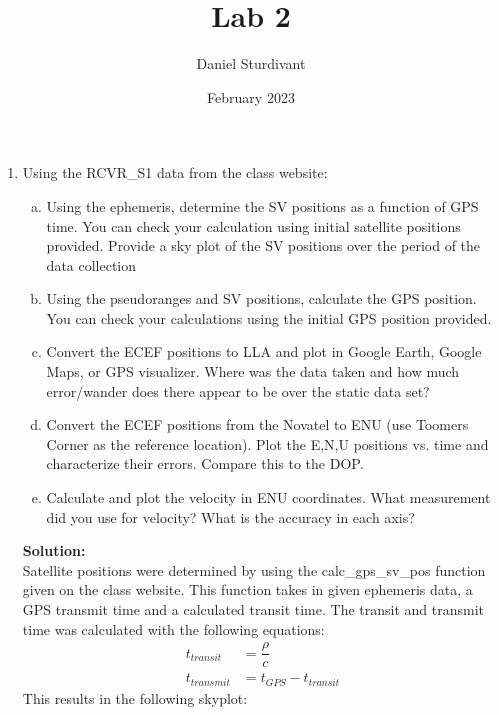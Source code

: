 \documentclass[11pt]{article}
\author{Daniel Sturdivant}
\title{Lab 2}
\date{February 2023}
\newcommand{\solution}{\textbf{Solution: \\}}
\begin{document}
\maketitle
\thispagestyle{fancy}
\setlength{\parindent}{0pt}

\begin{enumerate}[label=\textbf{\arabic*.}]
  \itemsep 24pt
  \item Using the RCVR\_S1 data from the class website: 
  \begin{enumerate}[(a)]
    \itemsep -2pt 
    \item Using the ephemeris, determine the SV positions as a function of GPS time. You can
    check your calculation using initial satellite positions provided. Provide a sky plot of the
    SV positions over the period of the data collection
    \item Using the pseudoranges and SV positions, calculate the GPS position. You can check
    your calculations using the initial GPS position provided.
    \item Convert the ECEF positions to LLA and plot in Google Earth, Google Maps, or GPS
    visualizer. Where was the data taken and how much error/wander does there appear to
    be over the static data set?
    \item Convert the ECEF positions from the Novatel to ENU (use Toomers Corner as the
    reference location). Plot the E,N,U positions vs. time and characterize their errors.
    Compare this to the DOP.
    \item Calculate and plot the velocity in ENU coordinates. What measurement did you use for
    velocity? What is the accuracy in each axis?
  \end{enumerate}
  \solution
  Satellite positions were determined by using the calc\_gps\_sv\_pos function 
  given on the class website. This function takes in given ephemeris data, a GPS 
  transmit time and a calculated transit time. The transit and transmit time was 
  calculated with the following equations:
  \begin{equation*}
    \begin{split}
      t_{transit} &= \dfrac{\rho}{c} \\
      t_{transmit} &= t_{GPS} - t_{transit}
    \end{split}
  \end{equation*}
  This results in the following skyplot:
  \begin{figure}[H]

\end{figure}
\end{enumerate}
\end{document}

